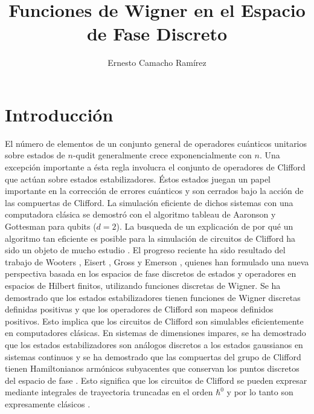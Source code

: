 \documentclass[a4paper]{report}
\title{Funciones de Wigner en el Espacio de Fase Discreto}
\author{Ernesto Camacho Ramírez}
\begin{document}
  \maketitle

  \tableofcontents

  \section{Introducción}

  El número de elementos de un conjunto general de
  operadores cuánticos unitarios sobre estados de $n$-qudit
  generalmente crece exponencialmente con $n$. Una excepción
  importante a ésta regla involucra el conjunto de
  operadores de Clifford que actúan sobre estados
  estabilizadores. Éstos estados juegan un papel importante
  en la corrección de errores cuánticos
  \cite{gottesmanHeisenbergRepresentationQuantum1998} y son
  cerrados bajo la acción de las compuertas de Clifford. La
  simulación eficiente de dichos sistemas con una
  computadora clásica se demostró con el algoritmo tableau
  de Aaronson y Gottesman \cite{
    aaronsonImprovedSimulationStabilizer2004,
  gottesmanHeisenbergRepresentationQuantum1998} para qubits
  ($d=2$). La busqueda de un explicación de por qué un
  algoritmo tan eficiente es posible para la simulación de
  circuitos de Clifford ha sido un objeto de mucho estudio
  \cite{gottesmanFaultTolerantQuantumComputation1999,
    howardContextualitySuppliesMagic2014,
  mariPositiveWignerFunctions2012}. El progreso reciente ha
  sido resultado del trabajo de Wooters
  \cite{woottersWignerFunctionFormulationFiniteState1987},
  Eisert \cite{mariPositiveWignerFunctions2012}, Gross
  \cite{grossHudsonTheoremFinitedimensional2006} y Emerson
  \cite{howardContextualitySuppliesMagic2014}, quienes han
  formulado una nueva perspectiva basada en los espacios de
  fase discretos de estados y operadores en espacios de
  Hilbert finitos, utilizando funciones discretas de Wigner.
  Se ha demostrado que los estados estabilizadores tienen
  funciones de Wigner discretas definidas positivas y que
  los operadores de Clifford son mapeos definidos positivos.
  Esto implica que los circuitos de Clifford son simulables
  eficientemente en computadores clásicas. En sistemas de
  dimensiones impares, se ha demostrado que los estados
  estabilizadores son análogos discretos a los estados
  gaussianos en sistemas continuos
  \cite{grossHudsonTheoremFinitedimensional2006} y se ha
  demostrado que las compuertas del grupo de Clifford tienen
  Hamiltonianos armónicos subyacentes que conservan los
  puntos discretos del espacio de fase
  \cite{kociaSemiclassicalFormulationGottesmanKnill2017}.
  Esto significa que los circuitos de Clifford se pueden
  expresar mediante integrales de trayectoria truncadas en
  el orden $\hbar^{0}$ y por lo tanto son expresamente
  clásicos
  \cite{kociaSemiclassicalFormulationGottesmanKnill2017,
  kohComputingQuopitClifford2017}.
\end{document}
